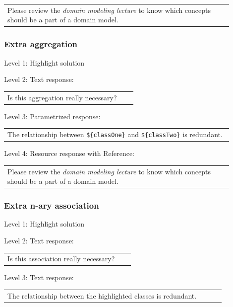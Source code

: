 \begin{tabular}{|p{0.9\linewidth}}
Please review the \textit{domain modeling lecture} to know which concepts should be a part of a domain model.
\end{tabular} \medskip


\subsubsection{Extra aggregation}

\noindent Level 1: Highlight solution  \medskip

\noindent Level 2: Text response: \medskip

\begin{tabular}{|p{0.9\linewidth}}
Is this aggregation really necessary?
\end{tabular} \medskip

\noindent Level 3: Parametrized response: \medskip

\begin{tabular}{|p{0.9\linewidth}}
The relationship between \verb|${classOne}| and \verb|${classTwo}| is redundant.
\end{tabular} \medskip

\noindent Level 4: Resource response with Reference: \medskip

\begin{tabular}{|p{0.9\linewidth}}
Please review the \textit{domain modeling lecture} to know which concepts should be a part of a domain model.
\end{tabular} \medskip


\subsubsection{Extra n-ary association}

\noindent Level 1: Highlight solution  \medskip

\noindent Level 2: Text response: \medskip

\begin{tabular}{|p{0.9\linewidth}}
Is this association really necessary?
\end{tabular} \medskip

\noindent Level 3: Text response: \medskip

\begin{tabular}{|p{0.9\linewidth}}
The relationship between the highlighted classes is redundant.
\end{tabular} \medskip

